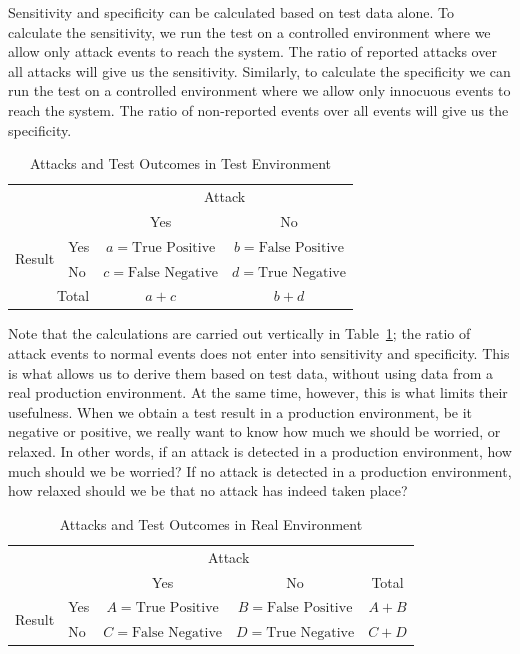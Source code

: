 \documentclass[conference]{IEEEtran}
\begin{document}
Sensitivity and specificity can be calculated based on test
data alone. To calculate the sensitivity, we run the test on a
controlled environment where we allow only attack events to reach the
system. The ratio of reported attacks over all attacks will give us
the sensitivity. Similarly, to calculate the specificity we can run
the test on a controlled environment where we allow only innocuous
events to reach the system. The ratio of non-reported events over all
events will give us the specificity. 

\begin{table}[ht]

\caption{Attacks and Test Outcomes in Test Environment}
\label{tab:sensitivity-specificity}

\begin{tabular}{l|l|c|c|}
\multicolumn{2}{c}{} & \multicolumn{2}{c}{Attack} \\ \cline{3-4}
\multicolumn{2}{c|}{} & Yes & No \\ \cline{2-4}
\multirow{2}{*}{Result} &  Yes &  $a = \textrm{True Positive}$ & 
$b = \textrm{False Positive}$ \\
& No & $c = \textrm{False Negative}$ & $d = \textrm{True Negative}$ \\ 
\cline{2-4}
\multicolumn{2}{r|}{Total} & $a + c$ & $b + d$ \\
\cline{3-4}
\end{tabular}

\end{table}

Note that the calculations are carried out vertically in
Table~\ref{tab:sensitivity-specificity}; the ratio of attack events to
normal events does not enter into sensitivity and specificity. This is
what allows us to derive them based on test data, without using data
from a real production environment. At the same time, however, this is
what limits their usefulness. When we obtain a test result in a
production environment, be it negative or positive, we really want to
know how much we should be worried, or relaxed. In other words, if an
attack is detected in a production environment, how much should we be
worried? If no attack is detected in a production environment, how
relaxed should we be that no attack has indeed taken place?

\begin{table}[ht]

\caption{Attacks and Test Outcomes in Real Environment}
\label{tab:ppv-npv}

\begin{tabular}{l|l|c|c|c}
\multicolumn{2}{c}{} & \multicolumn{2}{c}{Attack} & \\ \cline{3-4}
\multicolumn{2}{c|}{} & Yes & No & Total \\ \cline{2-5}
\multirow{2}{*}{Result} &  Yes &  $A = \textrm{True Positive}$ & 
$B = \textrm{False Positive}$ & \multicolumn{1}{c|}{$A + B$}\\
& No & $C = \textrm{False Negative}$ & $D = \textrm{True Negative}$ &
\multicolumn{1}{c|}{$C + D$}\\ 
\cline{2-5}
\end{tabular}

\end{table}
\end{document}
